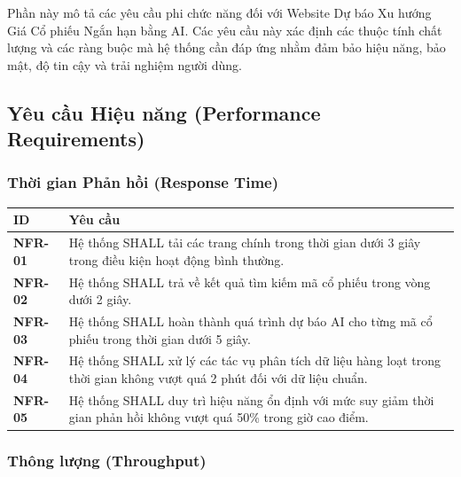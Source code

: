 \documentclass[12pt, a4paper]{article}
\begin{document}
Phần này mô tả các yêu cầu phi chức năng đối với Website Dự báo Xu hướng Giá Cổ phiếu Ngắn hạn bằng AI. Các yêu cầu này xác định các thuộc tính chất lượng và các ràng buộc mà hệ thống cần đáp ứng nhằm đảm bảo hiệu năng, bảo mật, độ tin cậy và trải nghiệm người dùng.

\subsection{Yêu cầu Hiệu năng (Performance Requirements)}

\subsubsection{Thời gian Phản hồi (Response Time)}

\begin{table}[H]
    \centering
    \renewcommand{\arraystretch}{1.3}

    \begin{tabularx}{\textwidth}{|l|X|}
        \hline
        \rowcolor{gray!10}
        \textbf{ID}     & \textbf{Yêu cầu}                                                                                                         \\
        \hline
        \textbf{NFR-01} & Hệ thống SHALL tải các trang chính trong thời gian dưới 3 giây trong điều kiện hoạt động bình thường.                    \\
        \hline
        \textbf{NFR-02} & Hệ thống SHALL trả về kết quả tìm kiếm mã cổ phiếu trong vòng dưới 2 giây.                                               \\
        \hline
        \textbf{NFR-03} & Hệ thống SHALL hoàn thành quá trình dự báo AI cho từng mã cổ phiếu trong thời gian dưới 5 giây.                          \\
        \hline
        \textbf{NFR-04} & Hệ thống SHALL xử lý các tác vụ phân tích dữ liệu hàng loạt trong thời gian không vượt quá 2 phút đối với dữ liệu chuẩn. \\
        \hline
        \textbf{NFR-05} & Hệ thống SHALL duy trì hiệu năng ổn định với mức suy giảm thời gian phản hồi không vượt quá 50\% trong giờ cao điểm.     \\
        \hline
    \end{tabularx}

\end{table}

\subsubsection{Thông lượng (Throughput)}
\end{document}
